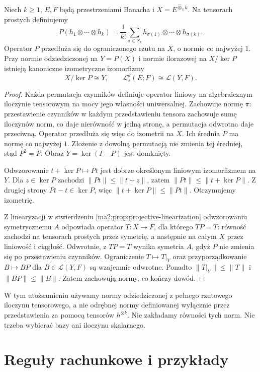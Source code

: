 \begin{stwierdzenie}
\label{ma2:prop:symmetric-projective-linearization}
Niech $k\ge1$, $E,F$ będą przestrzeniami Banacha i
$X=E^{\widehat\otimes_\pi k}$. Na tensorach prostych
definiujemy
\[
 P(h_1\otimes\cdots\otimes h_k)
 =\frac1{k!}\sum_{\sigma\in S_k}
 h_{\sigma(1)}\otimes\cdots\otimes h_{\sigma(k)}.
\]
Operator $P$ przedłuża się do ograniczonego rzutu
na $X$, o normie co najwyżej $1$. Przy normie
odziedziczonej na $Y=P(X)$ i normie ilorazowej
na $X/\ker P$ istnieją kanoniczne izometryczne
izomorfizmy
\[
 X/\ker P\cong Y,\qquad
 \mathcal L_s^k(E;F)\cong\mathcal L(Y,F).
\]
\end{stwierdzenie}
\begin{proof}
Każda permutacja czynników definiuje operator liniowy
na algebraicznym iloczynie tensorowym na mocy jego
własności uniwersalnej. Zachowuje normę $\pi$:
przestawienie czynników w każdym przedstawieniu
tensora zachowuje sumę iloczynów norm, co daje
nierówność w jedną stronę, a permutacja odwrotna
daje przeciwną. Operator przedłuża się więc do
izometrii na $X$. Ich średnia $P$ ma normę co najwyżej
$1$. Złożenie z dowolną permutacją nie zmienia tej
średniej, stąd $P^2=P$. Obraz $Y=\ker(I-P)$ jest
domknięty.

Odwzorowanie $t+\ker P\mapsto Pt$ jest dobrze
określonym liniowym izomorfizmem na $Y$.
Dla $z\in\ker P$ zachodzi
$\|Pt\|\le\|t+z\|$, zatem
$\|Pt\|\le\|t+\ker P\|$. Z drugiej strony
$Pt-t\in\ker P$, więc
$\|t+\ker P\|\le\|Pt\|$. Otrzymujemy izometrię.

Z linearyzacji w stwierdzeniu
\ref{ma2:prop:projective-linearization}
odwzorowaniu symetrycznemu $A$ odpowiada
operator $T:X\to F$, dla którego $TP=T$:
równość zachodzi na tensorach prostych przez
symetrię, a następnie na całym $X$ przez liniowość
i ciągłość. Odwrotnie, z $TP=T$ wynika symetria
$A$, gdyż $P$ nie zmienia się po przestawieniu
czynników. Ograniczenie $T\mapsto T|_Y$ oraz
przyporządkowanie $B\mapsto BP$ dla $B\in\mathcal L(Y,F)$
są wzajemnie odwrotne. Ponadto
$\|T|_Y\|\le\|T\|$ i $\|BP\|\le\|B\|$.
Zatem zachowują normy, co kończy dowód.
\end{proof}

W tym utożsamieniu używamy normy odziedziczonej
z pełnego rzutowego iloczynu tensorowego, a nie
odrębnej normy definiowanej wyłącznie przez
przedstawienia za pomocą tensorów $h^{\otimes k}$.
Nie zakładamy równości tych norm.
Nie trzeba wybierać bazy ani iloczynu skalarnego.

\section{Reguły rachunkowe i przykłady}

